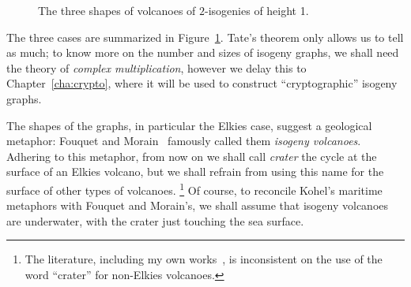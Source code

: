\documentclass{report}
\theoremstyle{plain}
\theoremstyle{definition}
\begin{document}
\begin{figure}[h]
  \centering
  \caption{The three shapes of volcanoes of $2$-isogenies of height 1.}
  \label{fig:volcanology}
\end{figure}

The three cases are summarized in Figure~\ref{fig:volcanology}. %
Tate's theorem only allows us to tell as much; to know more on the
number and sizes of isogeny graphs, we shall need the theory of
\emph{complex multiplication}, however we delay this to
Chapter~\ref{cha:crypto}, where it will be used to construct
``cryptographic'' isogeny graphs. %

The shapes of the graphs, in particular the Elkies case, suggest a
geological metaphor: Fouquet and Morain~\cite{fouquet+morain02}
famously called them \emph{isogeny volcanoes}. %
Adhering to this metaphor, from now on we shall call \emph{crater} the
cycle at the surface of an Elkies volcano, but we shall refrain from
using this name for the surface of other types of volcanoes.%
\footnote{The literature, including my own
  works~\cite{defeo2016explicit}, is inconsistent on the use of the
  word ``crater'' for non-Elkies volcanoes.} %
Of course, to reconcile Kohel's maritime metaphors with Fouquet and
Morain's, we shall assume that isogeny volcanoes are underwater, with
the crater just touching the sea surface.
\end{document}
